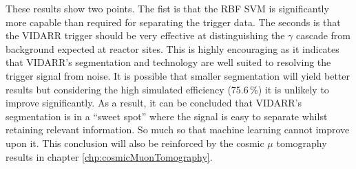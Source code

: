 \clearpage
These results show two points. The fist is that the RBF SVM is significantly more capable than required for separating the trigger data. The seconds is that the VIDARR trigger should be very effective at distinguishing the $\gamma$ cascade from background expected at reactor sites. This is highly encouraging as it indicates that VIDARR's segmentation and technology are well suited to resolving the trigger signal from noise. It is possible that smaller segmentation will yield better results but considering the high simulated efficiency (75.6\,\%) it is unlikely to improve significantly. As a result, it can be concluded that VIDARR's segmentation is in a ``sweet spot'' where the signal is easy to separate whilst retaining relevant information. So much so that machine learning cannot improve upon it. This conclusion will also be reinforced by the cosmic $\mu$ tomography results in chapter \ref{chp:cosmicMuonTomography}.



